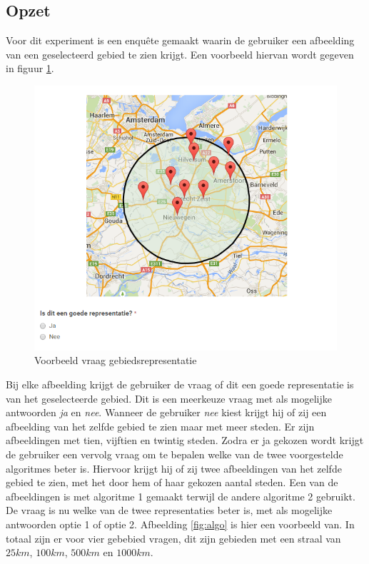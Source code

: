 \documentclass[twoside,openright]{uva-bachelor-thesis}
\begin{document}
		\subsection{Opzet}
			Voor dit experiment is een enqu\^ete gemaakt waarin de gebruiker een afbeelding van een geselecteerd gebied te zien krijgt. Een voorbeeld hiervan wordt gegeven in figuur \ref{fig:area_rep}.
			\begin{figure}[!htb]
				\centering
				\includegraphics[scale=0.8]{./img/area_rep.png}
				\caption{Voorbeeld vraag gebiedsrepresentatie}
				\label{fig:area_rep}
			\end{figure}
			Bij elke afbeelding krijgt de gebruiker de vraag of dit een goede representatie is van het geselecteerde gebied. Dit is een meerkeuze vraag met als mogelijke antwoorden \textit{ja} en \textit{nee}. Wanneer de gebruiker \textit{nee} kiest krijgt hij of zij een afbeelding van het zelfde gebied te zien maar met meer steden. Er zijn afbeeldingen met tien, vijftien en twintig steden. Zodra er ja gekozen wordt krijgt de gebruiker een vervolg vraag om te bepalen welke van de twee voorgestelde algoritmes beter is. Hiervoor krijgt hij of zij twee afbeeldingen van het zelfde gebied te zien, met het door hem of haar gekozen aantal steden. Een van de afbeeldingen is met algoritme 1 gemaakt terwijl de andere algoritme 2 gebruikt. De vraag is nu welke van de twee representaties beter is, met als mogelijke antwoorden optie 1 of optie 2. Afbeelding \ref{fig:algo} is hier een voorbeeld van. In totaal zijn er voor vier gebebied vragen, dit zijn gebieden met een straal van $25km$, $100km$, $500km$ en $1000km$.
\end{document}
